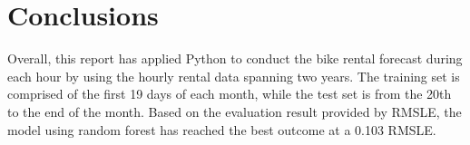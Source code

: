 \section{Conclusions} \label{sec-conclusions}

Overall, this report has applied Python to conduct the bike rental forecast during each hour by using the hourly rental data spanning two years. The training set is comprised of the first 19 days of each month, while the test set is from the 20th to the end of the month. Based on the evaluation result provided by RMSLE, the model using random forest has reached the best outcome at a 0.103 RMSLE.

